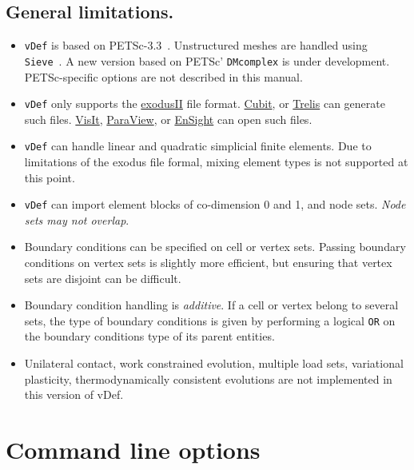 \documentclass[10pt,oneside]{memoir}
\def\vDef{{\texttt{vDef}} }
\begin{document}
\section{General limitations.}
\begin{itemize}
\item \vDef is based on PETSc-3.3~\cite{petsc-efficient,petsc-user-ref,petsc-web-page}. Unstructured meshes are handled using \texttt{Sieve}~\cite{Knepley-Karpeev-2009a}. A new version based on PETSc' \texttt{DMcomplex} is under development. PETSc-specific options are not described in this manual.
\item \vDef only supports the \href{http://sourceforge.net/projects/exodusii/}{exodusII} file format. \href{http://cubit.sandia.gov}{Cubit}, or \href{http://www.csimsoft.com/trelis.jsp}{Trelis} can generate such files. \href{https://wci.llnl.gov/codes/visit/}{VisIt}, \href{http://paraview.org}{ParaView}, or \href{http://www.ceisoftware.com}{EnSight} can open such files.
\item \vDef can handle linear and quadratic simplicial finite elements. Due to limitations of the exodus file formal, mixing element types is not supported at this point.
\item \vDef can import element blocks of co-dimension 0 and 1, and node sets. \emph{Node sets may not overlap}.
\item Boundary conditions can be specified on cell or vertex sets. Passing boundary conditions on vertex sets is slightly more efficient, but ensuring that vertex sets are disjoint can be difficult.
\item Boundary condition handling is \emph{additive}. If a cell or vertex belong to several sets, the type of boundary conditions is given by performing a logical \verb+OR+ on the boundary conditions type of its parent entities. 
\item Unilateral contact, work constrained evolution, multiple load sets, variational plasticity, thermodynamically consistent evolutions are not implemented in this version of vDef.
\end{itemize}

\chapter{Command line options}
\end{document}
